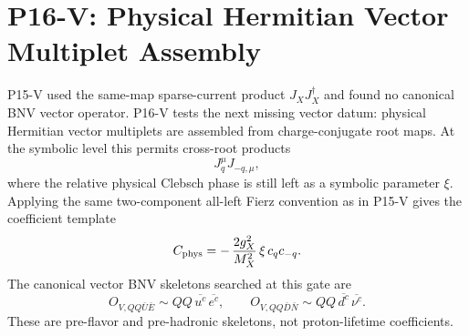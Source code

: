 \documentclass[11pt]{article}
\newcommand{\uc}{u^c}
\newcommand{\dc}{d^c}
\newcommand{\nuc}{\nu^c}
\newcommand{\ec}{e^c}
\begin{document}
\section{P16-V: Physical Hermitian Vector Multiplet Assembly}

P15-V used the same-map sparse-current product $J_XJ_X^\dagger$ and found no
canonical BNV vector operator.  P16-V tests the next missing vector datum:
physical Hermitian vector multiplets are assembled from charge-conjugate root
maps.  At the symbolic level this permits cross-root products
\begin{equation}
  J_q^\mu J_{-q,\mu},
\end{equation}
where the relative physical Clebsch phase is still left as a symbolic
parameter $\xi$.  Applying the same two-component all-left Fierz convention as
in P15-V gives the coefficient template
\begin{equation}
  C_{\rm phys}
  =
  -\,\frac{2g_X^2}{M_X^2}\,
  \xi\,c_q c_{-q}.
\end{equation}
The canonical vector BNV skeletons searched at this gate are
\begin{equation}
  O_{V,QQ\bar U\bar E}\sim
  QQ\,\overline{\uc}\,\overline{\ec},
  \qquad
  O_{V,QQ\bar D\bar N}\sim
  QQ\,\overline{\dc}\,\overline{\nuc}.
\end{equation}
These are pre-flavor and pre-hadronic skeletons, not proton-lifetime
coefficients.
\end{document}
